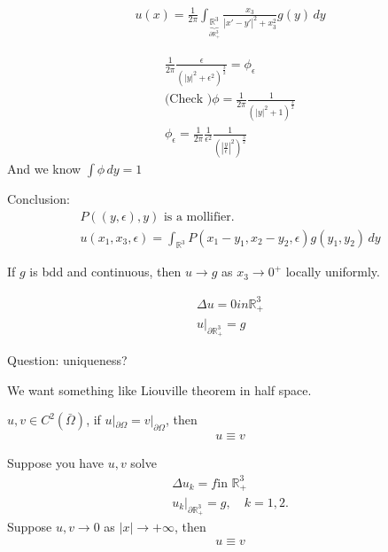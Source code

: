 \documentclass[11pt]{article}
\begin{document}
\begin{align*}
    u(x) = \frac{1}{2\pi}\int_{\underbrace{\mathbb{R}^{3}}_{\partial \mathbb{R}_{+}^{3}}}
    \frac{x_3}{|x'-y'|^{2}+x_3^{2}}g(y)\,dy 
\end{align*}

\begin{align*}
    \frac{1}{2\pi} \frac{\epsilon}{(|y|^{2} + \epsilon^{2})^{\frac{3}{2}}} = \phi_{\epsilon}\\
    \text{(Check )} \phi = \frac{1}{2\pi} \frac{1}{(|y|^{2} + 1)^{\frac{3}{2}}}\\
    \phi_{\epsilon} = \frac{1}{2\pi} \frac{1}{\epsilon^{2}} \frac{1}{(|\frac{y}{\epsilon}|^{2})
    ^{\frac{3}{2}}}
\end{align*}
And we know $\int \phi \, dy = 1$

Conclusion:
\begin{align*}
    P((y,\epsilon), y) \text{ is a mollifier.}\\
    u(x_1,x_3,\epsilon) = \int_{\mathbb{R}^{3}} P(x_1-y_1, x_2-y_2, \epsilon)g(y_1,y_2)\,dy
\end{align*}

\begin{proposition}
    If $g$ is bdd and continuous, then $u \longrightarrow g$ as $x_3 \longrightarrow 0^{+}$ locally 
    uniformly.    
\end{proposition}

\begin{equation}
    \begin{aligned}
    \Delta u = 0  in \mathbb{R}_{+}^{3}\\
    u|_{\partial \mathbb{R}_{+}^{3}} = g
    \end{aligned}
\end{equation}

Question: uniqueness?

We want something like Liouville theorem in half space.

\begin{theorem}
    $u, v \in C^{2}(\bar{\Omega})$, if $u|_{\partial \Omega} = v|_{\partial \Omega}$, then 
    \begin{align*}
        u \equiv v
    \end{align*}
\end{theorem}

\begin{theorem}[Uniqueness]
    Suppose you have $u,v$ solve 
\begin{align*}
    \Delta u_{k} =f \text{in }\mathbb{R}_{+}^{3}\\
    u_{k}|_{\partial \mathbb{R}_{+}^{3}} = g, \quad k=1,2.
\end{align*}
Suppose $u,v \longrightarrow 0$ as $|x| \longrightarrow +\infty$, then
\begin{align*}
    u \equiv v 
\end{align*}
\end{theorem}
\end{document}
